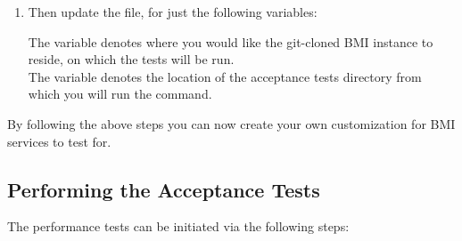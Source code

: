 \begin{enumerate}
\item Then update the  file, for just the following variables: 

      The  variable denotes where you would like the git-cloned BMI instance to reside, on which the tests will be run. \\

   The  variable denotes the location of the acceptance
   tests directory from which you will run the  command. \\
\end{enumerate}

By following the above steps you can now create your own customization for BMI services to test for.




\subsection{Performing the Acceptance Tests \\} 

The performance tests can be initiated via the following steps: 

